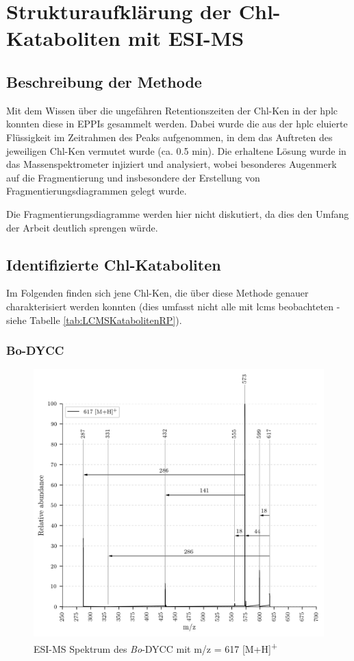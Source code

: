 \chapter{Strukturaufklärung der Chl-Kataboliten mit ESI-MS} \label{sec:ChlKatabolitenESIMS}

\section{Beschreibung der Methode}

Mit dem Wissen über die ungefähren Retentionszeiten der \gls{Chl-K}en in der \gls{hplc} konnten diese in EPPIs gesammelt werden. Dabei wurde die aus der \gls{hplc} eluierte Flüssigkeit im Zeitrahmen des Peaks aufgenommen, in dem das Auftreten des jeweiligen \gls{Chl-K}en vermutet wurde (ca. 0.5 min). Die erhaltene Lösung wurde in das Massenspektrometer injiziert und analysiert, wobei besonderes Augenmerk auf die Fragmentierung und insbesondere der Erstellung von Fragmentierungsdiagrammen gelegt wurde. 

Die Fragmentierungsdiagramme werden hier nicht diskutiert, da dies den Umfang der Arbeit deutlich sprengen würde. 

\section{Identifizierte Chl-Kataboliten}

Im Folgenden finden sich jene \gls{Chl-K}en, die über diese Methode genauer charakterisiert werden konnten (dies umfasst nicht alle mit \gls{lcms} beobachteten - siehe Tabelle \ref{tab:LCMSKatabolitenRP}). 

\subsection{Bo-DYCC}

\begin{figure}[!htbp]
  \centering
  \includegraphics[width=\textwidth, height=0.6\textwidth]{figures/Kapitel7/Kataboliten/VWA_MS_617.png}
  \caption[ESI-MS Spektrum des \textit{Bo}-DYCC, Quelle: Autor]{ESI-MS Spektrum des \textit{Bo}-DYCC mit m/z = 617 [M+H]\textsuperscript{+}}
  \label{fig:617MH}
\end{figure}

